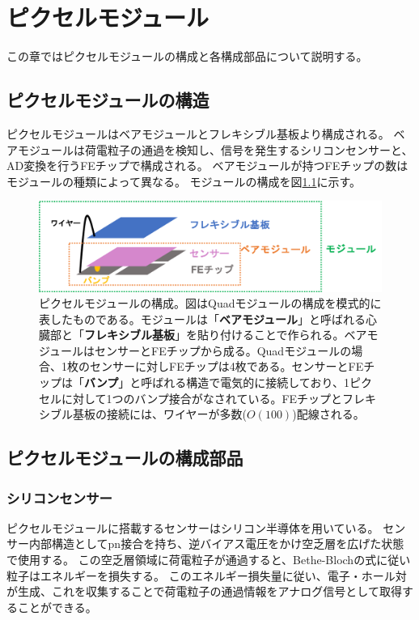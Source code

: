 \chapter{ピクセルモジュール}
この章ではピクセルモジュールの構成と各構成部品について説明する。

\section{ピクセルモジュールの構造}
ピクセルモジュールはベアモジュールとフレキシブル基板より構成される。
ベアモジュールは荷電粒子の通過を検知し、信号を発生するシリコンセンサーと、AD変換を行うFEチップで構成される。
ベアモジュールが持つFEチップの数はモジュールの種類によって異なる。
モジュールの構成を図\ref{module_configuration}に示す。

\begin{figure}[bpt]\centering
\includegraphics[width=14cm]{module_configuration}
\caption[ピクセルモジュールの構成]{ピクセルモジュールの構成。図はQuadモジュールの構成を模式的に表したものである。モジュールは「\textbf{ベアモジュール}」と呼ばれる心臓部と「\textbf{フレキシブル基板}」を貼り付けることで作られる。ベアモジュールはセンサーとFEチップから成る。Quadモジュールの場合、1枚のセンサーに対しFEチップは4枚である。センサーとFEチップは「\textbf{バンプ}」と呼ばれる構造で電気的に接続しており、1ピクセルに対して1つのバンプ接合がなされている。FEチップとフレキシブル基板の接続には、ワイヤーが多数($O(100)$)配線される。}
\label{module_configuration}
\end{figure}

\section{ピクセルモジュールの構成部品}
\subsection{シリコンセンサー}
ピクセルモジュールに搭載するセンサーはシリコン半導体を用いている。
センサー内部構造としてpn接合を持ち、逆バイアス電圧をかけ空乏層を広げた状態で使用する\cite{2-1}。
この空乏層領域に荷電粒子が通過すると、Bethe-Blochの式\cite{2-3}に従い粒子はエネルギーを損失する。
このエネルギー損失量に従い、電子・ホール対が生成、これを収集することで荷電粒子の通過情報をアナログ信号として取得することができる。

